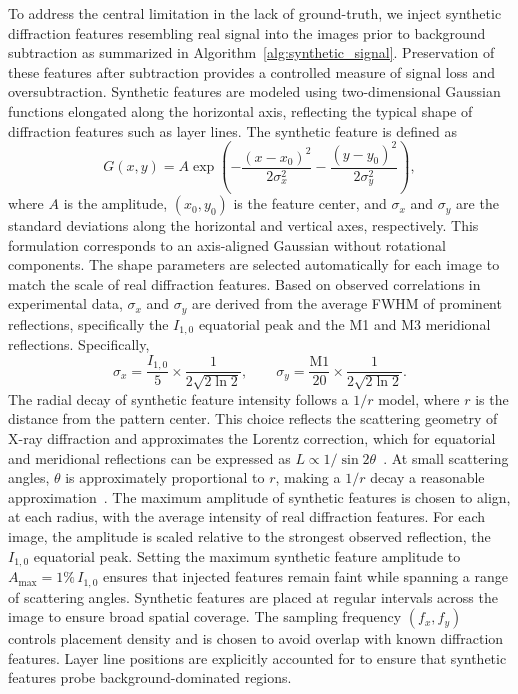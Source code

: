 \documentclass[iucr]{iucrjournals}
\begin{document}
To address the central limitation in the lack of ground-truth, we inject synthetic diffraction features resembling real signal into the images prior to background subtraction as summarized in Algorithm~\ref{alg:synthetic_signal}. Preservation of these features after subtraction provides a controlled measure of signal loss and oversubtraction. Synthetic features are modeled using two-dimensional Gaussian functions elongated along the horizontal axis, reflecting the typical shape of diffraction features such as layer lines. The synthetic feature is defined as
\begin{equation}
G(x, y) = A \exp\!\left(
-\frac{(x-x_0)^2}{2\sigma_x^2}
-\frac{(y-y_0)^2}{2\sigma_y^2}
\right),
\end{equation}
where $A$ is the amplitude, $(x_0, y_0)$ is the feature center, and $\sigma_x$ and $\sigma_y$ are the standard deviations along the horizontal and vertical axes, respectively. This formulation corresponds to an axis-aligned Gaussian without rotational components. The shape parameters are selected automatically for each image to match the scale of real diffraction features. Based on observed correlations in experimental data, $\sigma_x$ and $\sigma_y$ are derived from the average FWHM of prominent reflections, specifically the $I_{1,0}$ equatorial peak and the M1 and M3 meridional reflections. Specifically,
\begin{equation}
\sigma_x = \frac{I_{1,0}}{5} \times \frac{1}{2\sqrt{2\ln2}}, 
\qquad
\sigma_y = \frac{\mathrm{M1}}{20} \times \frac{1}{2\sqrt{2\ln2}}.
\end{equation}
The radial decay of synthetic feature intensity follows a $1/r$ model, where $r$ is the distance from the pattern center. This choice reflects the scattering geometry of X-ray diffraction and approximates the Lorentz correction, which for equatorial and meridional reflections can be expressed as $L \propto 1/\sin 2\theta$~\cite{Buerger1940}. At small scattering angles, $\theta$ is approximately proportional to $r$, making a $1/r$ decay a reasonable approximation~\cite{Denny1995}. The maximum amplitude of synthetic features is chosen to align, at each radius, with the average intensity of real diffraction features. For each image, the amplitude is scaled relative to the strongest observed reflection, the $I_{1,0}$ equatorial peak. Setting the maximum synthetic feature amplitude to $A_{\mathrm{max}} = 1\%\, I_{1,0}$ ensures that injected features remain faint while spanning a range of scattering angles. Synthetic features are placed at regular intervals across the image to ensure broad spatial coverage. The sampling frequency $(f_x, f_y)$ controls placement density and is chosen to avoid overlap with known diffraction features. Layer line positions are explicitly accounted for to ensure that synthetic features probe background-dominated regions.
\end{document}
